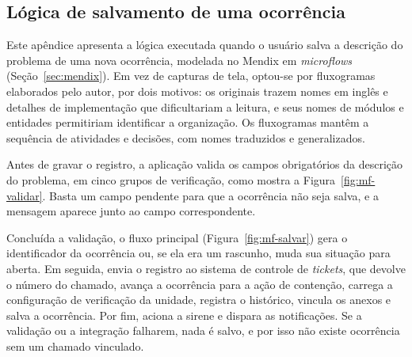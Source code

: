 
\begin{apendicesenv}
\chapter{Lógica de salvamento de uma ocorrência}
\label{ap:salvar}

Este apêndice apresenta a lógica executada quando o usuário salva a descrição do problema de uma nova ocorrência, modelada no Mendix em \textit{microflows} (Seção~\ref{sec:mendix}). Em vez de capturas de tela, optou-se por fluxogramas elaborados pelo autor, por dois motivos: os originais trazem nomes em inglês e detalhes de implementação que dificultariam a leitura, e seus nomes de módulos e entidades permitiriam identificar a organização. Os fluxogramas mantêm a sequência de atividades e decisões, com nomes traduzidos e generalizados.

Antes de gravar o registro, a aplicação valida os campos obrigatórios da descrição do problema, em cinco grupos de verificação, como mostra a Figura~\ref{fig:mf-validar}. Basta um campo pendente para que a ocorrência não seja salva, e a mensagem aparece junto ao campo correspondente.

Concluída a validação, o fluxo principal (Figura~\ref{fig:mf-salvar}) gera o identificador da ocorrência ou, se ela era um rascunho, muda sua situação para aberta. Em seguida, envia o registro ao sistema de controle de \textit{tickets}, que devolve o número do chamado, avança a ocorrência para a ação de contenção, carrega a configuração de verificação da unidade, registra o histórico, vincula os anexos e salva a ocorrência. Por fim, aciona a sirene e dispara as notificações. Se a validação ou a integração falharem, nada é salvo, e por isso não existe ocorrência sem um chamado vinculado.


\end{apendicesenv}
